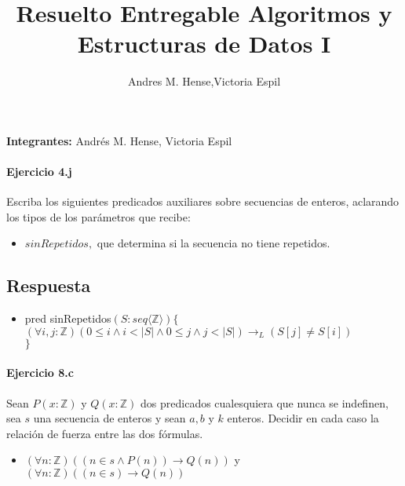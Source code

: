 \documentclass[a4paper]{article}
\title{Resuelto Entregable Algoritmos y Estructuras de Datos I}
\author{Andres M. Hense,Victoria Espil}
\date{} %
\begin{document}




\begin{center}
\textbf{Integrantes:} Andrés M. Hense, Victoria Espil
\end{center}

\paragraph{Ejercicio 4.j} Escriba los siguientes predicados auxiliares sobre secuencias de enteros, aclarando los tipos de los parámetros que recibe:

\begin{itemize}
	\item $sinRepetidos,$ que determina si la secuencia no tiene repetidos.
\end{itemize}

\subsection*{Respuesta}

\begin{itemize}
	\item pred sinRepetidos$(S: seq\langle \mathbb{Z} \rangle)\{$\\
\hspace*{6mm}$(\forall i,j:\mathbb{Z})(0\leq i\wedge i<\vert S\vert \wedge 0\leq j\wedge j<\vert S\vert)\rightarrow_L (S[j] \neq S[i])$\\
$\}$
\end{itemize}

\paragraph{Ejercicio 8.c} Sean $P(x:\mathbb{Z})$ y $Q(x:\mathbb{Z})$ dos predicados cualesquiera que nunca se indefinen, sea $s$ una secuencia de enteros y sean $a,b$ y $k$ enteros. Decidir en cada caso la relación de fuerza entre las dos fórmulas.

\begin{itemize}
	\item $(\forall n:\mathbb{Z})((n \in s \wedge P(n))\rightarrow Q(n))$ y $(\forall n: \mathbb{Z})((n \in s)\rightarrow Q(n))$
\end{itemize}
\end{document}
